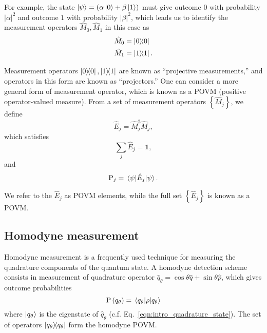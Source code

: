 \noindent For example, the state $\ket{\psi} = \left(\alpha\ket{0}  + \beta\ket{1}\right)$ must give outcome $0$ with probability $\left|\alpha\right|^2$ and outcome $1$ with probability $\left|\beta\right|^2$, which leads us to identify the measurement operators $\hat{M}_0, \hat{M}_1$ in this case as
\begin{align*}
&\hat{M}_0 = \dyad{0} \\
&\hat{M}_1 = \dyad{1}.
\end{align*}

\noindent Measurement operators $\dyad{0}, \dyad{1}$ are known as ``projective measurements,'' and operators in this form are known as ``projectors.'' One can consider a more general form of measurement operator, which is known as a POVM (positive operator-valued measure). From a set of measurement operators $\left\{\hat{M}_j\right\}$, we define
\begin{equation}
\hat{E}_j = \hat{M}^\dagger_j \hat{M}_j,
\end{equation}
which satisfies
\begin{equation}
\sum_j \hat{E}_j = \mathds{1},
\end{equation}
and
\begin{equation}
\text{P}_j = \ev{\hat{E}_j}{\psi}.
\end{equation}

\noindent We refer to the $\hat{E}_j$ as POVM elements, while the full set $\left\{\hat{E}_j\right\}$ is known as a POVM.



\FloatBarrier
\subsection{Homodyne measurement}\label{sec:intro_homodyne}
Homodyne measurement is a frequently used technique for measuring the quadrature components of the quantum state. A homodyne detection scheme consists in measurement of quadrature operator $\hat{q}_\theta = \cos\theta \hat{q} + \sin\theta \hat{p}$, which gives outcome probabilities
\begin{equation}
\text{P}\left(q_\theta\right) = \ev{\rho}{q_\theta}
\end{equation}
where $\ket{q_\theta}$ is the eigenstate of $\hat{q}_\theta$ (c.f. Eq.~\ref{eqn:intro_quadrature_state}). %
The set of operators $\dyad{q_\theta}$ form the homodyne POVM.


